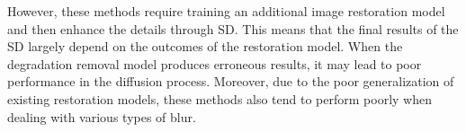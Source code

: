 %
However, these methods require training an additional image restoration model and then enhance the details through SD. 
%
This means that the final results of the SD largely depend on the outcomes of the restoration model. 
%
When the degradation removal model produces erroneous results, it may lead to poor performance in the diffusion process. 
%
Moreover, due to the poor generalization of existing restoration models, these methods also tend to perform poorly when dealing with various types of blur.
%


